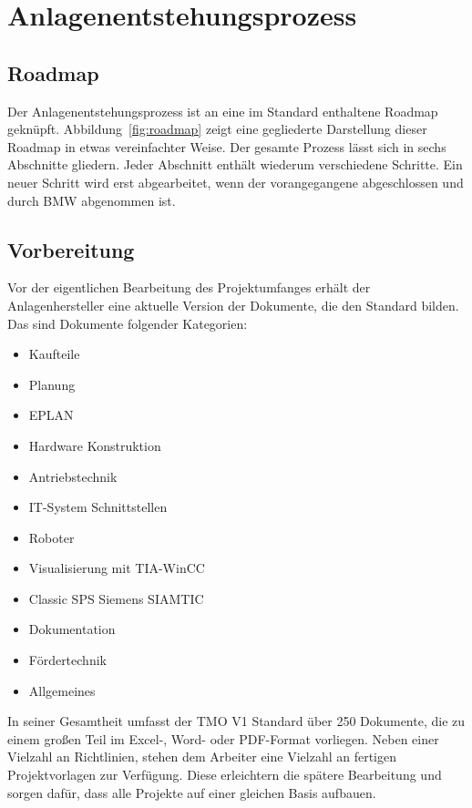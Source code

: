 

\chapter{Anlagenentstehungsprozess}
\section{Roadmap}
Der Anlagenentstehungsprozess ist an eine im Standard enthaltene Roadmap geknüpft. Abbildung~\ref{fig:roadmap} zeigt eine gegliederte Darstellung dieser Roadmap in etwas vereinfachter Weise. %
Der gesamte Prozess lässt sich in sechs Abschnitte gliedern. Jeder Abschnitt enthält wiederum verschiedene Schritte. Ein neuer Schritt wird erst abgearbeitet, wenn der vorangegangene abgeschlossen und durch BMW abgenommen ist.

\section{Vorbereitung}
Vor der eigentlichen Bearbeitung des Projektumfanges erhält der Anlagenhersteller eine aktuelle Version der Dokumente, die den Standard bilden. Das sind Dokumente folgender Kategorien:
\begin{spacing}{0.5}
  \begin{itemize}
    \item Kaufteile
    \item Planung
    \item EPLAN
    \item Hardware Konstruktion
    \item Antriebstechnik
    \item IT-System Schnittstellen
    \item Roboter
    \item Visualisierung mit TIA-WinCC
    \item Classic SPS Siemens SIAMTIC
    \item Dokumentation
    \item Fördertechnik
    \item Allgemeines
  \end{itemize}

\end{spacing}
In seiner Gesamtheit umfasst der TMO V1 Standard über 250 Dokumente, die zu einem großen Teil im Excel-, Word- oder PDF-Format vorliegen. Neben einer Vielzahl an Richtlinien, stehen dem Arbeiter eine Vielzahl an fertigen Projektvorlagen zur Verfügung. Diese erleichtern die spätere Bearbeitung und sorgen dafür, dass alle Projekte auf einer gleichen Basis aufbauen.
